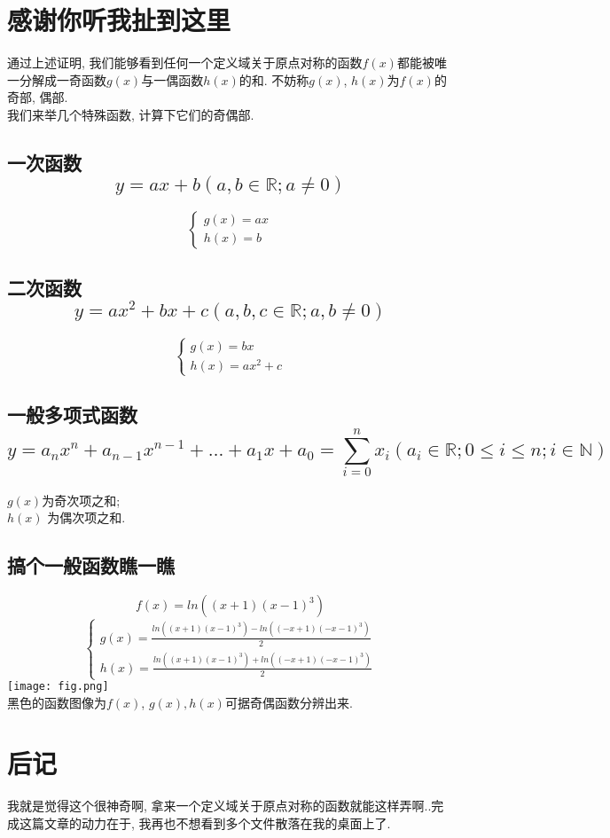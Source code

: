 \documentclass{article}
\begin{document}
\begin{CJK}{UTF8}{gkai}
\section{感谢你听我扯到这里}
通过上述证明, 我们能够看到任何一个定义域关于原点对称的函数$f(x)$都能被唯一分解成一奇函数$g(x)$与一偶函数$h(x)$的和. 不妨称$g(x)$, $h(x)$为$f(x)$的奇部, 偶部.\\
我们来举几个特殊函数, 计算下它们的奇偶部. 
\subsection{一次函数$$y = ax + b(a,b \in \mathbb{R}; a \not = 0)$$}
\begin{equation}
\begin{cases}
g(x) = ax\\
h(x) = b
\end{cases}
\end{equation}

\subsection{二次函数$$y = ax^2 + bx + c (a, b ,c \in \mathbb{R}; a, b \not = 0)$$}
\begin{equation}
\begin{cases}
g(x) = bx\\
h(x) = ax^2 +  c
\end{cases}
\end{equation}

\subsection{一般多项式函数$$y = a_nx^n + a_{n-1}x^{n-1} + \ldots + a_1x + a_0 = \sum_{i=0}^{n}{x_i}(a_i \in \mathbb{R}; 0 \le i \le n; i \in \mathbb{N})$$}
$g(x)$为奇次项之和;\\
$h(x)$ 为偶次项之和.


\subsection{搞个一般函数瞧一瞧}
$$f(x)=ln((x+1)(x-1)^3)$$
\begin{equation}
\begin{cases}
g(x) = \frac{ln((x+1)(x-1)^3)-ln((-x+1)(-x-1)^3)}{2}\\
h(x) = \frac{ln((x+1)(x-1)^3)+ln((-x+1)(-x-1)^3)}{2}
\end{cases}
\end{equation}
\texttt{[image: fig.png]}\\
黑色的函数图像为$f(x)$, $g(x), h(x)$可据奇偶函数分辨出来. 

\section{后记}
我就是觉得这个很神奇啊, 拿来一个定义域关于原点对称的函数就能这样弄啊..完成这篇文章的动力在于, 我再也不想看到多个文件散落在我的桌面上了.



\end{CJK}
\end{document}
